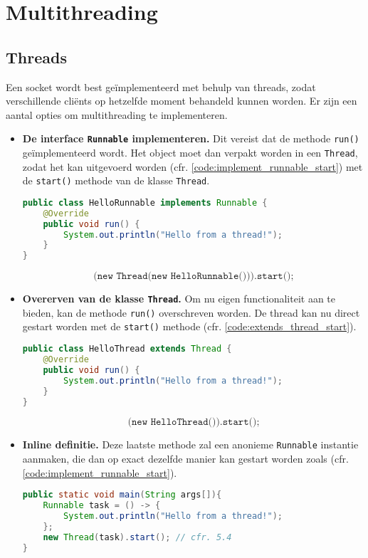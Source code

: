 \documentclass{report}
\begin{document}
\section{Multithreading}
\subsection{Threads}
Een socket wordt best geïmplementeerd met behulp van threads, zodat verschillende cliënts op hetzelfde moment behandeld kunnen worden. Er zijn een aantal opties om multithreading te implementeren.
\begin{itemize}
	\item[\info] \textbf{De interface \texttt{Runnable} implementeren.} Dit vereist dat de methode \texttt{run()} geïmplementeerd wordt. Het object moet dan verpakt worden in een \texttt{Thread}, zodat het kan uitgevoerd worden (cfr. \ref{code:implement_runnable_start}) met de \texttt{start()} methode van de klasse \texttt{Thread}.
	\begin{lstlisting}[language=java]
public class HelloRunnable implements Runnable {
	@Override
	public void run() {
		System.out.println("Hello from a thread!");
	}
}
	\end{lstlisting}
	\begin{equation}
		\texttt{(new Thread(new HelloRunnable())).start();}
		\label{code:implement_runnable_start}
	\end{equation}
	\item[\info] \textbf{Overerven van de klasse \texttt{Thread}.} Om nu eigen functionaliteit aan te bieden, kan de methode \texttt{run()} overschreven worden. De thread kan nu direct gestart worden met de \texttt{start()} methode (cfr. \ref{code:extends_thread_start}).
	\begin{lstlisting}[language=java]
public class HelloThread extends Thread {
	@Override
	public void run() {
		System.out.println("Hello from a thread!");
	}
}
	\end{lstlisting}
	\begin{equation}
		\texttt{(new HelloThread()).start();}
		\label{code:extends_thread_start}
	\end{equation}
	\item[\info] \textbf{Inline definitie.} Deze laatste methode zal een anonieme \texttt{Runnable} instantie aanmaken, die dan op exact dezelfde manier kan gestart worden zoals (cfr. \ref{code:implement_runnable_start}).
	\begin{lstlisting}[language=java]
public static void main(String args[]){
	Runnable task = () -> {
		System.out.println("Hello from a thread!");
	};
	new Thread(task).start(); // cfr. 5.4
}
	\end{lstlisting}
\end{itemize}
\end{document}
